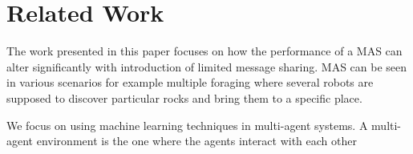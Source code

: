 \section{Related Work}
The work presented in this paper focuses on how the performance of a MAS can alter significantly with introduction of limited message sharing. MAS can be seen in various scenarios for example multiple foraging where several robots are supposed to discover particular rocks and bring them to a specific place. 



We focus on using machine learning techniques in multi-agent systems.
A multi-agent environment is the one where the agents interact with each other